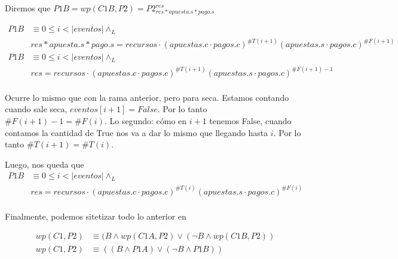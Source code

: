 \documentclass[../document.tex]{subfiles}
\begin{document}
Diremos que $P1B = wp(C1B,P2) = P2^{res}_{res * apuesta.s * pago.s}$

\begin{equation} \label{eq2.b}
\begin{split}
P1B & \equiv 0\leq i < |eventos| \land_L \\& res * apuesta.s * pago.s = recursos \cdot (apuestas.c\cdot pagos.c)^{\#T(i+1)}(apuestas.s\cdot pagos.c)^{\#F(i+1)}\\
P1B & \equiv 0\leq i < |eventos| \land_L \\& res = recursos \cdot (apuestas.c\cdot pagos.c)^{\#T(i+1)}(apuestas.s\cdot pagos.c)^{\#F(i+1)-1}\\
\end{split}
\end{equation}

Ocurre lo mismo que con la rama anterior, pero para seca.
Estamos contando cuando sale seca, $eventos[i+1] = False$. Por lo tanto $\#F(i+1)-1=\#F(i)$. Lo segundo: cómo en $i+1$ tenemos False, cuando contamos la cantidad de True nos va a dar lo mismo que llegando hasta $i$. Por lo tanto $\#T(i+1)=\#T(i)$.

Luego, nos queda que
\begin{equation}
    \begin{split}
    P1B & \equiv 0\leq i < |eventos| \land_L \\& res = recursos \cdot (apuestas.c\cdot pagos.c)^{\#T(i)}(apuestas.s\cdot pagos.c)^{\#F(i)}\\
    \end{split}
\end{equation}

Finalmente, podemos sitetizar todo lo anterior en

\begin{equation} \label{final}
\begin{split}
    wp(C1,P2) &\equiv (B \land wp(C1A, P2) \lor (\neg B \land wp(C1B, P2))\\
    wp(C1,P2) &\equiv ((B \land P1A) \lor (\neg B \land P1B))\\
\end{split}
\end{equation}

\end{document}
